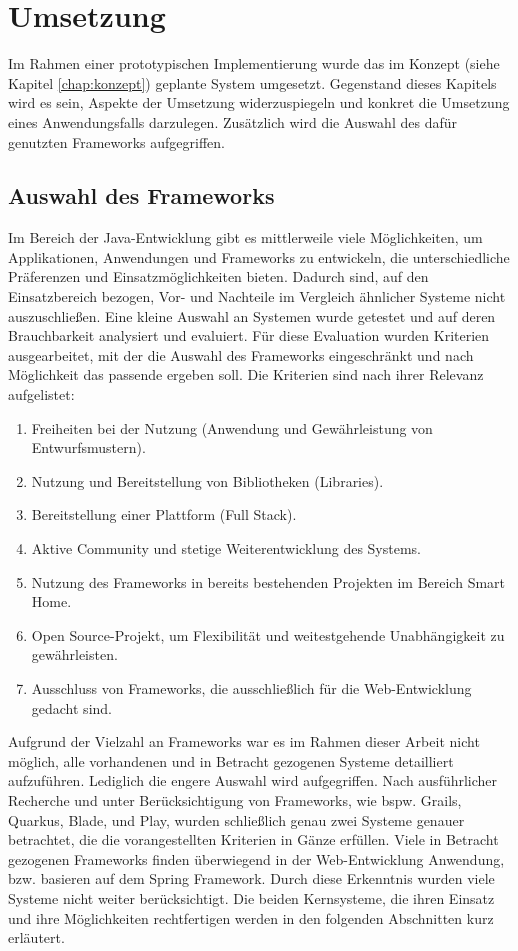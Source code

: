\chapter{Umsetzung}
\label{chap:umsetzung}
    Im Rahmen einer prototypischen Implementierung wurde das im Konzept (siehe Kapitel \ref{chap:konzept}) geplante System
    umgesetzt. Gegenstand dieses Kapitels wird es sein, Aspekte der Umsetzung widerzuspiegeln und konkret die Umsetzung eines  
    Anwendungsfalls darzulegen. Zusätzlich wird die Auswahl des dafür genutzten Frameworks aufgegriffen. 

\section{Auswahl des Frameworks}
\label{sec:frameworkauswahl}
    Im Bereich der Java-Entwicklung gibt es mittlerweile viele Möglichkeiten, um Applikationen, Anwendungen und Frameworks 
    zu entwickeln, die unterschiedliche Präferenzen und Einsatzmöglichkeiten bieten. Dadurch sind, auf den Einsatzbereich bezogen, 
    Vor- und Nachteile im Vergleich ähnlicher Systeme nicht auszuschließen. Eine kleine Auswahl an Systemen wurde getestet und auf deren 
    Brauchbarkeit analysiert und evaluiert. Für diese Evaluation wurden Kriterien ausgearbeitet, mit der die Auswahl des Frameworks 
    eingeschränkt und nach Möglichkeit das passende ergeben soll. Die Kriterien sind nach ihrer Relevanz aufgelistet: 
    \begin{enumerate}
        \item Freiheiten bei der Nutzung (Anwendung und Gewährleistung von Entwurfsmustern).
        \item Nutzung und Bereitstellung von Bibliotheken (Libraries).
        \item Bereitstellung einer Plattform (Full Stack).
        \item Aktive Community und stetige Weiterentwicklung des Systems.
        \item Nutzung des Frameworks in bereits bestehenden Projekten im Bereich Smart Home.
        \item Open Source-Projekt, um Flexibilität und weitestgehende Unabhängigkeit zu gewährleisten.
        \item Ausschluss von Frameworks, die ausschließlich für die Web-Entwicklung gedacht sind.
    \end{enumerate}  
    Aufgrund der Vielzahl an Frameworks war es im Rahmen dieser Arbeit nicht möglich, alle vorhandenen und in Betracht 
    gezogenen Systeme detailliert aufzuführen. Lediglich die engere Auswahl wird aufgegriffen. 
    Nach ausführlicher Recherche und unter Berücksichtigung von Frameworks, wie bspw. Grails, Quarkus, Blade, und Play, wurden 
    schließlich genau zwei Systeme genauer betrachtet, die die vorangestellten Kriterien in Gänze erfüllen. Viele in Betracht gezogenen Frameworks 
    finden überwiegend in der Web-Entwicklung Anwendung, bzw. basieren auf dem Spring Framework. Durch diese Erkenntnis wurden 
    viele Systeme nicht weiter berücksichtigt. Die beiden Kernsysteme, die ihren Einsatz und ihre Möglichkeiten rechtfertigen
    werden in den folgenden Abschnitten kurz erläutert.

